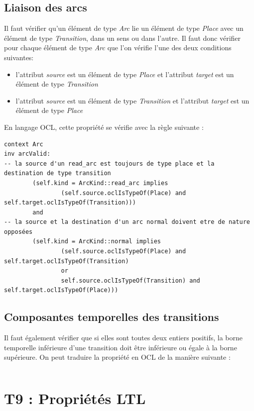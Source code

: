 \documentclass{report}
\begin{document}
\subsection{Liaison des arcs}
Il faut vérifier qu'un élément de type \textit{Arc} lie un élément de type \textit{Place} avec un élément de type \textit{Transition}, dans un sens ou dans l'autre. Il faut donc vérifier pour chaque élément de type \textit{Arc} que l'on vérifie l'une des deux conditions suivantes:
\begin{itemize}
\item l'attribut \textit{source} est un élément de type \textit{Place} et l'attribut \textit{target} est un élément de type \textit{Transition}
\item l'attribut \textit{source} est un élément de type \textit{Transition} et l'attribut \textit{target} est un élément de type \textit{Place}
\end{itemize}
En langage OCL, cette propriété se vérifie avec la règle suivante :

\begin{verbatim}
context Arc
inv arcValid:
-- la source d'un read_arc est toujours de type place et la destination de type transition
        (self.kind = ArcKind::read_arc implies 
                (self.source.oclIsTypeOf(Place) and self.target.oclIsTypeOf(Transition)))
        and 
-- la source et la destination d'un arc normal doivent etre de nature opposées 
        (self.kind = ArcKind::normal implies 
                (self.source.oclIsTypeOf(Place) and self.target.oclIsTypeOf(Transition)
                or
                self.source.oclIsTypeOf(Transition) and self.target.oclIsTypeOf(Place)))
\end{verbatim}

\subsection{Composantes temporelles des transitions}

Il faut également vérifier que si elles sont toutes deux entiers positifs, la borne temporelle inférieure d'une transition doit être inférieure ou égale à la borne supérieure. On peut traduire la propriété en OCL de la manière suivante :

\begin{verbatim}
\end{verbatim}

\section{T9 : Propriétés LTL}
\end{document}
